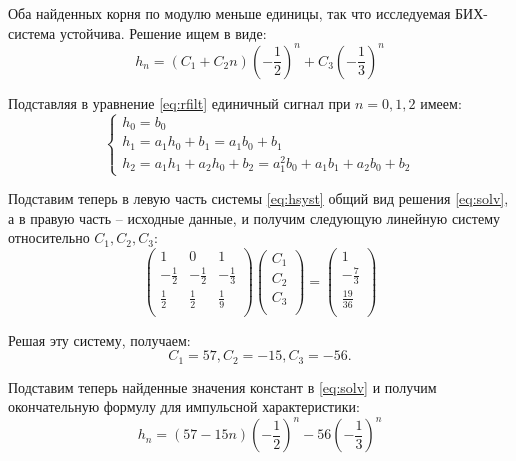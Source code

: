 \documentclass[a4paper,14pt]{article}
\begin{document}
	Оба найденных корня по модулю меньше единицы, так что исследуемая БИХ-система устойчива. Решение ищем в виде:
	\begin{equation} \label{eq:solv}
		h_n = (C_1 + C_2 n) \left ( -\frac{1}{2} \right )^n + C_3 \left (-\frac{1}{3}\right )^n 
	\end{equation}
	
	Подставляя в уравнение \eqref{eq:rfilt} единичный сигнал при $n = 0, 1, 2$ имеем:
	\begin{equation}
	\begin{cases} \label{eq:hsyst}
	h_0 = b_0\\
	h_1 = a_1 h_0 + b_1 = a_1 b_0 + b_1\\
	h_2 = a_1 h_1 + a_2 h_0 + b_2 = a_1^2 b_0 + a_1 b_1 + a_2 b_0 + b_2
	\end{cases}
	\end{equation}
	
	Подставим теперь в левую часть системы \eqref{eq:hsyst} общий вид решения \eqref{eq:solv}, а в правую часть -- исходные данные, и получим следующую линейную систему относительно $C_1, C_2, C_3$:
	\begin{equation}
		\begin{pmatrix}
		1 & 0 & 1 \\
		-\frac{1}{2} & -\frac{1}{2} & -\frac{1}{3}\\
		\frac{1}{2} & \frac{1}{2} & \frac{1}{9}\\
		\end{pmatrix}
		\begin{pmatrix}
		C_1 \\
		C_2 \\
		C_3 \\
		\end{pmatrix}
		=
		\begin{pmatrix}
		1 \\
		-\frac{7}{3}\\
		\frac{19}{36}\\
		\end{pmatrix}
	\end{equation}
	
	Решая эту систему, получаем:
	\begin{equation}
	C_1 = 57, C_2 = -15, C_3 = -56.
	\end{equation}
	
	Подставим теперь найденные значения констант в \eqref{eq:solv} и получим окончательную формулу для импульсной характеристики:
	\begin{equation}
	h_n = (57 - 15 n) \left ( -\frac{1}{2} \right )^n -56 \left (-\frac{1}{3}\right )^n 
	\end{equation}
	
\end{document}
